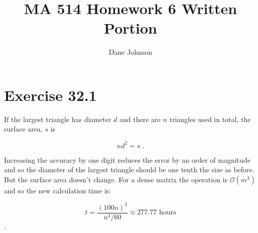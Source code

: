 \documentclass[11pt]{article}
\title{MA 514 Homework 6 Written Portion}
\author{Dane Johnson}
\begin{document}
\maketitle

\section*{Exercise 32.1}

If the largest triangle has diameter $d$ and there are $n$ triangles used in total, the surface area, $s$ is

$$nd^2 = s \;.$$

Increasing the accuracy by one digit reduces the error by an order of magnitude and so the diameter of the largest triangle should be one tenth the size as before. But the surface area doesn't change. For a dense matrix the operation is $\mathcal{O}(m^3)$ and so the new calculation time is:

$$t = \frac{(100n)^3}{n^3/60} \approx 277.77 \text{ hours}$$.
\end{document}
